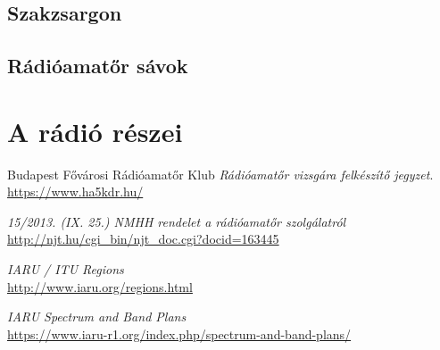 \documentclass[12pt,a4paper]{article}
\begin{document}
\subsection{Szakzsargon}

\subsection{Rádióamatőr sávok}

\section{A rádió részei}

\newpage

\renewcommand{\refname}{Irodalomjegyzék}
\begin{thebibliography}{9}
Budapest Fővárosi Rádióamatőr Klub 
\textit{Rádióamatőr vizsgára felkészítő jegyzet}. 
\\\url{https://www.ha5kdr.hu/}

\textit{15/2013. (IX. 25.) NMHH rendelet a rádióamatőr szolgálatról} 
\\\url{http://njt.hu/cgi_bin/njt_doc.cgi?docid=163445}

\textit{IARU / ITU Regions} 
\\\url{http://www.iaru.org/regions.html}

\textit{IARU Spectrum and Band Plans} 
\\\url{https://www.iaru-r1.org/index.php/spectrum-and-band-plans/}
\end{thebibliography}
\end{document}
